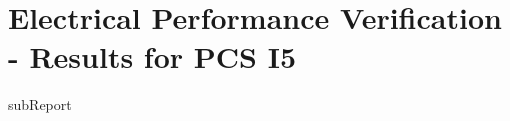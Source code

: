 \renewcommand{\DTRPcs}{I5} %
\renewcommand{\DTRPcsLong}{I5}


    \section{Electrical Performance Verification - Results for PCS \DTRPcsLong}

    {{subReport}}
    \newpage


